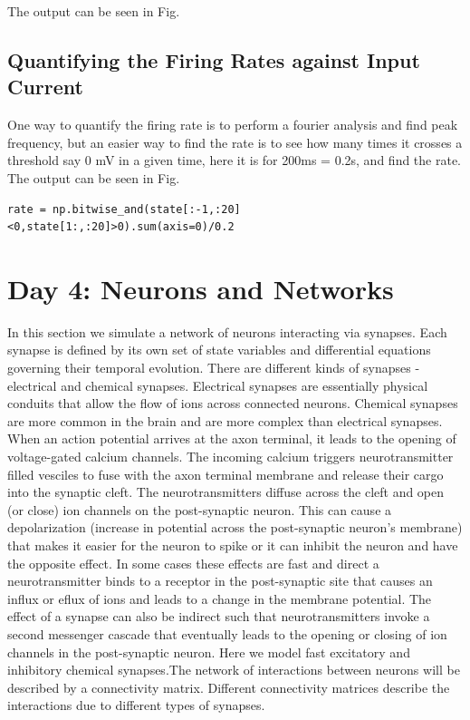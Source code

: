 \documentclass[10pt,letterpaper]{article}
\begin{document}
The output can be seen in Fig.

\subsection*{Quantifying the Firing Rates against Input Current}

One way to quantify the firing rate is to perform a fourier analysis and find peak frequency, but an easier way to find the rate is to see how many times it crosses a threshold say 0 mV in a given time, here it is for 200ms = 0.2s, and find the rate. The output can be seen in Fig.

\begin{verbatim}
rate = np.bitwise_and(state[:-1,:20]<0,state[1:,:20]>0).sum(axis=0)/0.2
\end{verbatim}

\section*{Day 4: Neurons and Networks}
In this section we simulate a network of neurons interacting via synapses. Each synapse is defined by its own set of state variables and differential equations governing their temporal evolution. There are different kinds of synapses - electrical and chemical synapses. Electrical synapses are essentially physical conduits that allow the flow of ions across connected neurons. Chemical synapses are more common in the brain and are more complex than electrical synapses. When an action potential arrives at the axon terminal, it leads to the opening of voltage-gated calcium channels. The incoming calcium triggers neurotransmitter filled vesciles to fuse with the axon terminal membrane and release their cargo into the synaptic cleft. The neurotransmitters diffuse across the cleft and open (or close) ion channels on the post-synaptic neuron. This can cause a depolarization (increase in potential across the post-synaptic neuron's membrane) that makes it easier for the neuron to spike or it can inhibit the neuron and have the opposite effect. In some cases these effects are fast and direct \textemdash a neurotransmitter binds to a receptor in the post-synaptic site that causes an influx or eflux of ions and leads to a change in the membrane potential. The effect of a synapse can also be indirect such that neurotransmitters invoke a second messenger cascade that eventually leads to the opening or closing of ion channels in the post-synaptic neuron. Here we model fast excitatory and inhibitory chemical synapses.The network of interactions between neurons will be described by a connectivity matrix. Different connectivity matrices describe the interactions due to different types of synapses. 
\end{document}
